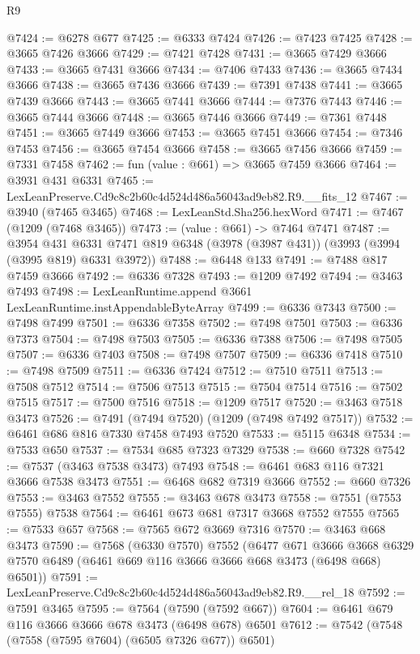 \begin{lexlean}{R9}
\begin{coremodule}
@7424 := @6278 @677
@7425 := @6333 @7424
@7426 := @7423 @7425
@7428 := @3665 @7426 @3666
@7429 := @7421 @7428
@7431 := @3665 @7429 @3666
@7433 := @3665 @7431 @3666
@7434 := @7406 @7433
@7436 := @3665 @7434 @3666
@7438 := @3665 @7436 @3666
@7439 := @7391 @7438
@7441 := @3665 @7439 @3666
@7443 := @3665 @7441 @3666
@7444 := @7376 @7443
@7446 := @3665 @7444 @3666
@7448 := @3665 @7446 @3666
@7449 := @7361 @7448
@7451 := @3665 @7449 @3666
@7453 := @3665 @7451 @3666
@7454 := @7346 @7453
@7456 := @3665 @7454 @3666
@7458 := @3665 @7456 @3666
@7459 := @7331 @7458
@7462 := fun (value : @661) => @3665 @7459 @3666
@7464 := @3931 @431 @6331
@7465 := LexLeanPreserve.Cd9c8c2b60c4d524d486a56043ad9eb82.R9.__fits_12
@7467 := @3940 (@7465 @3465)
@7468 := LexLeanStd.Sha256.hexWord
@7471 := @7467 (@1209 (@7468 @3465))
@7473 := (value : @661) -> @7464 @7471
@7487 := @3954
    @431
    @6331
    @7471
    @819
    @6348
    (@3978 (@3987 @431))
    (@3993 (@3994 (@3995 @819) @6331 @3972))
@7488 := @6448 @133
@7491 := @7488 @817 @7459 @3666
@7492 := @6336 @7328
@7493 := @1209 @7492
@7494 := @3463 @7493
@7498 := LexLeanRuntime.append @3661 LexLeanRuntime.instAppendableByteArray
@7499 := @6336 @7343
@7500 := @7498 @7499
@7501 := @6336 @7358
@7502 := @7498 @7501
@7503 := @6336 @7373
@7504 := @7498 @7503
@7505 := @6336 @7388
@7506 := @7498 @7505
@7507 := @6336 @7403
@7508 := @7498 @7507
@7509 := @6336 @7418
@7510 := @7498 @7509
@7511 := @6336 @7424
@7512 := @7510 @7511
@7513 := @7508 @7512
@7514 := @7506 @7513
@7515 := @7504 @7514
@7516 := @7502 @7515
@7517 := @7500 @7516
@7518 := @1209 @7517
@7520 := @3463 @7518 @3473
@7526 := @7491 (@7494 @7520) (@1209 (@7498 @7492 @7517))
@7532 := @6461 @686 @816 @7330 @7458 @7493 @7520
@7533 := @5115 @6348
@7534 := @7533 @650
@7537 := @7534 @685 @7323 @7329
@7538 := @660 @7328
@7542 := @7537 (@3463 @7538 @3473) @7493
@7548 := @6461 @683 @116 @7321 @3666 @7538 @3473
@7551 := @6468 @682 @7319 @3666
@7552 := @660 @7326
@7553 := @3463 @7552
@7555 := @3463 @678 @3473
@7558 := @7551 (@7553 @7555) @7538
@7564 := @6461 @673 @681 @7317 @3668 @7552 @7555
@7565 := @7533 @657
@7568 := @7565 @672 @3669 @7316
@7570 := @3463 @668 @3473
@7590 := @7568
    (@6330 @7570)
    @7552
    (@6477
      @671
      @3666
      @3668
      @6329
      @7570
      @6489
      (@6461 @669 @116 @3666 @3666 @668 @3473 (@6498 @668) @6501))
@7591 := LexLeanPreserve.Cd9c8c2b60c4d524d486a56043ad9eb82.R9.__rel_18
@7592 := @7591 @3465
@7595 := @7564 (@7590 (@7592 @667))
@7604 := @6461 @679 @116 @3666 @3666 @678 @3473 (@6498 @678) @6501
@7612 := @7542 (@7548 (@7558 (@7595 @7604) (@6505 @7326 @677)) @6501)

\end{coremodule}
\end{lexlean}
